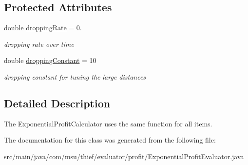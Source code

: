 \subsection*{Protected Attributes}
\begin{DoxyCompactItemize}
\item 
\hypertarget{classcom_1_1msu_1_1thief_1_1evaluator_1_1profit_1_1ExponentialProfitEvaluator_a0bee5d7f079a9676692e3faa5f9d2da9}{double \hyperlink{classcom_1_1msu_1_1thief_1_1evaluator_1_1profit_1_1ExponentialProfitEvaluator_a0bee5d7f079a9676692e3faa5f9d2da9}{dropping\-Rate} = 0.}\label{classcom_1_1msu_1_1thief_1_1evaluator_1_1profit_1_1ExponentialProfitEvaluator_a0bee5d7f079a9676692e3faa5f9d2da9}

\begin{DoxyCompactList}\small\item\em dropping rate over time \end{DoxyCompactList}\item 
\hypertarget{classcom_1_1msu_1_1thief_1_1evaluator_1_1profit_1_1ExponentialProfitEvaluator_a75237d11c10af36c7f466e462d25d894}{double \hyperlink{classcom_1_1msu_1_1thief_1_1evaluator_1_1profit_1_1ExponentialProfitEvaluator_a75237d11c10af36c7f466e462d25d894}{dropping\-Constant} = 10}\label{classcom_1_1msu_1_1thief_1_1evaluator_1_1profit_1_1ExponentialProfitEvaluator_a75237d11c10af36c7f466e462d25d894}

\begin{DoxyCompactList}\small\item\em dropping constant for tuning the large distances \end{DoxyCompactList}\end{DoxyCompactItemize}


\subsection{Detailed Description}
The Exponential\-Profit\-Calculator uses the same function for all items. 

The documentation for this class was generated from the following file\-:\begin{DoxyCompactItemize}
\item 
src/main/java/com/msu/thief/evaluator/profit/Exponential\-Profit\-Evaluator.\-java\end{DoxyCompactItemize}
